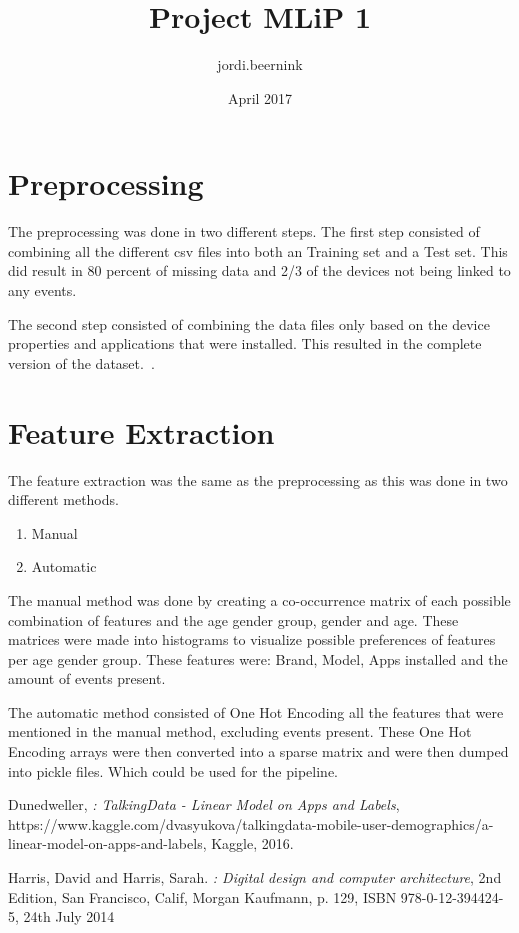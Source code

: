 \documentclass{article}
\title{Project MLiP 1}
\author{jordi.beernink }
\date{April 2017}
\begin{document}
\maketitle

\section{Preprocessing}
The preprocessing was done in two different steps. The first step consisted of combining all the different csv files into both an Training set and a Test set. This did result in 80 percent of missing data and 2/3 of the devices not being linked to any events. 

The second step consisted of combining the data files only based on the device properties and applications that were installed. This resulted in the complete version of the dataset.~\cite{Dune}.

\section{Feature Extraction}
The feature extraction was the same as the preprocessing as this was done in two different methods. 

\begin{enumerate}
\item Manual 
\item Automatic
\end{enumerate}

The manual method was done by creating a co-occurrence matrix of each possible combination of features and the age gender group, gender and age. These matrices were made into histograms to visualize possible preferences of features per age gender group. These features were: Brand, Model, Apps installed and the amount of events present.

The automatic method consisted of One Hot Encoding all the features that were mentioned in the manual method, excluding events present. These One Hot Encoding arrays were then converted into a sparse matrix and were then dumped into pickle files. Which could be used for the pipeline. 

{}


\begin{thebibliography}{9}

Dunedweller,
\emph{: TalkingData - Linear Model on Apps and Labels},
https://www.kaggle.com/dvasyukova/talkingdata-mobile-user-demographics/a-linear-model-on-apps-and-labels,
Kaggle,
2016.
  
Harris, David  and Harris, Sarah. 
\emph{: Digital design and computer architecture},  
2nd Edition,
San Francisco, Calif,
Morgan Kaufmann,
p. 129,
ISBN 978-0-12-394424-5,
24th July 2014

\end{thebibliography}
\end{document}
